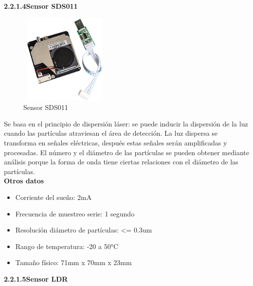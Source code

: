         \textbf{2.2.1.4\hspace{5mm}Sensor SDS011}

\vspace{1cm}

\begin{figure}[H]
      \centering
      \includegraphics[width=4.5cm, height=4.5cm]{imagenes/Sensor SDS011.jpg}
      \caption{Sensor SDS011}
      \label{imag:SDS011}
   \end{figure}

Se basa en el principio de dispersión láser: se puede inducir la dispersión de la luz cuando las partículas atraviesan el área de detección. La luz dispersa se transforma en señales eléctricas, después estas señales serán amplificadas y procesadas. El número y el diámetro de las partículas se pueden obtener mediante análisis porque la forma de onda tiene ciertas relaciones con el diámetro de las partículas.\\

\textbf{Otros datos}

\begin{itemize}
    \item Corriente del sueño: 2mA
    \item Frecuencia de muestreo serie: 1 segundo
    \item Resolución diámetro de partículas: <= 0.3um
    \item Rango de temperatura: -20 a 50°C
    \item Tamaño físico: 71mm x 70mm x 23mm 
\end{itemize}

\vspace{5cm}

        \textbf{2.2.1.5\hspace{5mm}Sensor LDR}\newline

